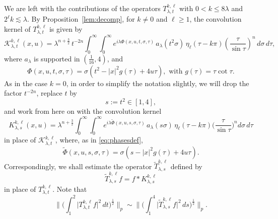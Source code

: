 \documentclass[leqno]{amsart}
\theoremstyle{definition}
\theoremstyle{remark}
\numberwithin{equation}{section}
\newcommand\la{{\lambda}}
\newcommand\sK{{\mathscr {K}}}
\begin{document}
We are left with the contributions of the operators $T_{\lambda,t}^{k,\ell}$ with $0<k\le 8\la$ and $2^\ell k\lesssim \la.$ By Proposition~\ref{lem:decomp}, for $k\neq 0$ and $\ell \ge 1$, the convolution kernel of $T_{\lambda,t}^{k,\ell}$ is given by
\[
\sK_{\lambda,t}^{k,\ell}(x, u) = \lambda^{ n + \frac{3}{2}} \, t^{-2n} \int_0^\infty \int_0^\infty  e^{i\lambda\Phi(x,u,t,\sigma,\tau)} \, a_\lambda(t^2\sigma) \, \eta_\ell( \tau -k \pi)\left(\frac{\tau}{\sin\tau}\right)^{n} \, d\sigma \, d\tau,
\]
where $a_\lambda$ is supported in $(\frac{1}{16}, 4 )$, and
\[
\Phi(x,u,t,\sigma,\tau) = \sigma( t^2-|x|^2 g(\tau) + 4u\tau), \text{ with } g(\tau) = \tau\cot \tau.
\]
As in the case $k=0$, in order to simplify the notation slightly, we will drop the factor $t^{-2n}$, replace $t$ by $$s := t^2\in[1,4],$$ and  work from here on with the convolution kernel
\begin{equation}\label{eq:K-kl-alt}
K_{\lambda,s}^{k,\ell}(x, u) = \lambda^{n + \frac 32} \int_0^\infty \int_0^\infty e^{i\lambda\tilde \Phi(x,u,s,\sigma,\tau)} \, a_\lambda(s\sigma) \, \eta_\ell(\tau -k \pi)\Big(\frac{\tau}{\sin\tau}\Big)^n d\sigma \, d\tau
\end{equation}
in place of $\sK_{\lambda,t}^{k,\ell}$,
where, as in \eqref{eq:phasesdef},
\begin{equation}\label{eq:phase-kl-alt}
\tilde \Phi(x,u,s,\sigma,\tau) = \sigma(s-|x|^2 g(\tau) + 4u\tau).
\end{equation}
Correspondingly,  we shall estimate the operator $\tilde T^{k,\ell}_{\la,s}$ defined by 
$$\tilde T^{k,\ell}_{\la,s} f = f*K_{\lambda,s}^{k,\ell}$$
 in place of $T_{\lambda,t}^{k,\ell}.$
Note that 
\begin{equation}\label{TtildeT}
\Big\| \Big( \int_1^2 \big| T_{\lambda,t}^{k,\ell} f \big|^2 \, dt \Big)^{\frac{1}{2}} \Big\|_p
\sim \Big\| \Big( \int_1^4 \big| \tilde{T}_{\lambda,s}^{k,\ell} f \big|^2 \, ds \Big)^{\frac{1}{2}} \Big\|_p.
\end{equation}
\end{document}

